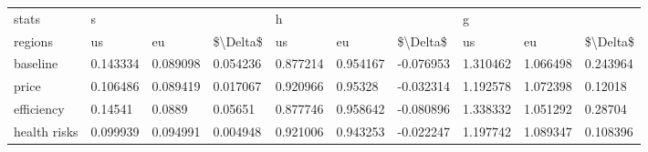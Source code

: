 \begin{tabular}{llllllllll}
\toprule
stats & \multicolumn{3}{l}{s} & \multicolumn{3}{l}{h} & \multicolumn{3}{l}{g} \\
regions &        us &        eu &  \$\textbackslash Delta\$ &        us &        eu &  \$\textbackslash Delta\$ &        us &        eu &  \$\textbackslash Delta\$ \\
\midrule
baseline     &  0.143334 &  0.089098 &  0.054236 &  0.877214 &  0.954167 & -0.076953 &  1.310462 &  1.066498 &  0.243964 \\
price        &  0.106486 &  0.089419 &  0.017067 &  0.920966 &   0.95328 & -0.032314 &  1.192578 &  1.072398 &   0.12018 \\
efficiency   &   0.14541 &    0.0889 &   0.05651 &  0.877746 &  0.958642 & -0.080896 &  1.338332 &  1.051292 &   0.28704 \\
health risks &  0.099939 &  0.094991 &  0.004948 &  0.921006 &  0.943253 & -0.022247 &  1.197742 &  1.089347 &  0.108396 \\
\bottomrule
\end{tabular}
